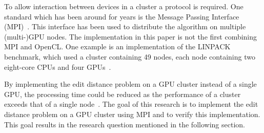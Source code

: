 To allow interaction between devices in a cluster a protocol is required.
One standard which has been around for years is the Message Passing Interface (MPI)~\cite{MPI}.
This interface has been used to distribute the algorithm on multiple (multi-)GPU nodes.
The implementation in this paper is not the first combining MPI and OpenCL.
One example is an implementation of the LINPACK benchmark, which used a cluster containing 49 nodes, each node containing two eight-core CPUs and four GPUs~\cite{Cluster}.

By implementing the edit distance problem on a GPU cluster instead of a single GPU, the processing time could be reduced as the performance of a cluster exceeds that of a single node~\cite{Cluster}.
The goal of this research is to implement the edit distance problem on a GPU cluster using MPI and to verify this implementation.
This goal results in the research question mentioned in the following section.

